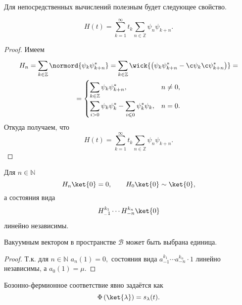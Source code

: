 \documentclass[a4paper,14pt]{extarticle}
\numberwithin{equation}{section}
\begin{document}
Для непосредственных вычислений полезным будет следующее свойство.
\begin{stm*}
\[
	H(t)= \sum_{k=1}^{\infty} t_k \sum_{n \in \mathbb{Z}}^{} \psi_n \psi_{k+n}
.\]
\end{stm*}
\begin{proof}
Имеем
\begin{multline}
	H_n= \sum_{k \in \mathbb{Z}}^{} \normord{\psi_k \psi_{k+n}^*}= \sum_{k \in \mathbb{Z}}^{} \wick{\left( 
	\psi_{k}\psi_{k+n}^*-\c \psi_k \c \psi_{k+n}^*\right) }=\\=\begin{cases}
		\displaystyle \sum_{k \in \mathbb{Z}}^{} \psi_k \psi_{k+n}^*, & n\neq 0,\\
		\displaystyle \sum_{i>0}^{} \psi_k \psi_k^*-
		\sum_{i\le 0}^{} \psi^*_k \psi_k,&
		n=0.
	\end{cases}
	\label{}
\end{multline}
Откуда получаем, что
\[
	H(t)= \sum_{k=1}^{\infty} t_k \sum_{n \in \mathbb{Z}}^{} \psi_n \psi_{k+n}
.\] 
\end{proof}
\begin{stm*}
	Для $n \in \mathbb{N}$
\[
H_n \ket{0}=0,\qquad H_0 \ket{0}\sim \ket{0}
,\]
а состояния вида
\[
H_{_-1}^{k_1}\cdots H_{-n}^{k_n} \ket{0}
\]
линейно независимы.
\end{stm*}
\begin{stm*}
	Вакуумным вектором в пространстве $\mathcal{B}$ 
	может быть выбрана единица.
\end{stm*}
\begin{proof}
	Т.\:к. для $n \in \mathbb{N}$ $a_n(1)=0
,$ состояния вида $a_{-1}^{k_1} \cdots a_{-n}^{k_n}\cdot 1$  линейно независимы, а $a_0(1)=\mu$.
\end{proof}
\begin{stm*}
Бозонно-фермионное соответствие явно задаётся как
\[
\Phi\left( \ket{\lambda} \right) = s_\lambda(t)
.\] 
\end{stm*}
\end{document}

